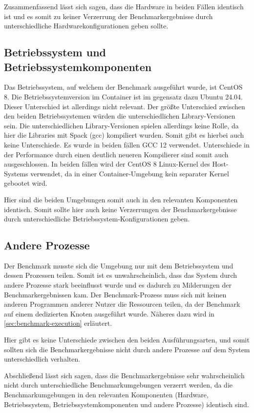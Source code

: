 Zusammenfassend lässt sich sagen, dass die Hardware in beiden Fällen identisch ist und es somit zu keiner Verzerrung der Benchmarkergebnisse durch unterschiedliche Hardwarekonfigurationen geben sollte. 

\subsection{Betriebssystem und Betriebssystemkomponenten}

Das Betriebssystem, auf welchem der Benchmark ausgeführt wurde, ist CentOS 8. Die Betriebssystemversion im Container ist im gegensatz dazu Ubuntu 24.04. Dieser Unterschied ist allerdings nicht relevant. Der größte Unterschied zwischen den beiden Betriebssystemen würden die unterschiedlichen Library-Versionen sein. Die unterschiedlichen Library-Versionen spielen allerdings keine Rolle, da hier die Libraries mit Spack (gcc) kompiliert wurden. Somit gibt es hierbei auch keine Unterschiede. Es wurde in beiden fällen GCC 12 verwendet. Unterschiede in der Performance durch einen deutlich neueren Kompilierer sind somit auch ausgeschlossen. In beiden fällen wird der CentOS 8 Linux-Kernel des Host-Systems verwendet, da in einer Container-Umgebung kein separater Kernel gebootet wird.

Hier sind die beiden Umgebungen somit auch in den relevanten Komponenten identisch. Somit sollte hier auch keine Verzerrungen der Benchmarkergebnisse durch unterschiedliche Betriebssystem-Konfigurationen geben.

\subsection{Andere Prozesse}

Der Benchmark musste sich die Umgebung nur mit dem Betriebssystem und dessen Prozessen teilen. Somit ist es unwahrscheinlich, dass das System durch andere Prozesse stark beeinflusst wurde und es dadurch zu Milderungen der Benchmarkergebnissen kam. Der Benchmark-Prozess muss sich mit keinen anderen Programmen anderer Nutzer die Ressourcen teilen, da der Benchmark auf einem dedizierten Knoten ausgeführt wurde. Näheres dazu wird in \cref{sec:benchmark-execution} erläutert.

Hier gibt es keine Unterschiede zwischen den beiden Ausführungsarten, und somit sollten sich die Benchmarkergebnisse nicht durch andere Prozesse auf dem System unterschiedlich verhalten.

Abschließend lässt sich sagen, dass die Benchmarkergebnisse sehr wahrscheinlich nicht durch unterschiedliche Benchmarkumgebungen verzerrt werden, da die Benchmarkumgebungen in den relevanten Komponenten (Hardware, Betriebssystem, Betriebssystemkomponenten und andere Prozesse) identisch sind.   

